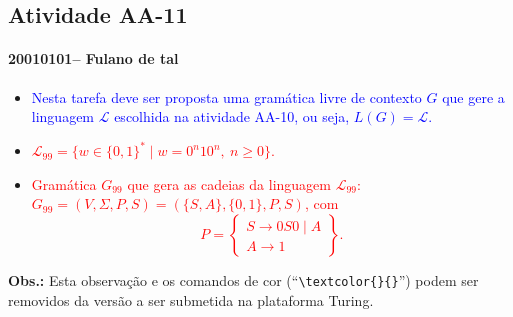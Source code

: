 \documentclass[12pt]{article}
\def\discente{Fulano de tal}
\def\matricula{20010101}
\def\aa{11}
\def\myling{{99}} %
\begin{document}
\subsection*{Atividade AA-\aa}
 \paragraph{\matricula -- \discente}
%
 \begin{itemize}
  \item \textcolor{blue}{Nesta tarefa deve ser proposta uma gramática livre de contexto $G$ que gere a linguagem $\mathcal{L}$ escolhida na atividade AA-10, ou seja, $L(G)=\mathcal{L}$.}
  \item \textcolor{red}{$\mathcal{L}_{\myling} = \{w\in\{0,1\}^*\mid w = 0^n10^n,\ n \geqslant 0\}$.}
  \item  \textcolor{red}{Gramática $G_{\myling}$ que gera as cadeias da linguagem $\mathcal{L}_{\myling}$:\\ $G_{\myling}=(V,\Sigma,P,S)=(\{S,A\},\{0,1\},P,S)$, com
  $$
   P =
   \left\{\begin{array}{l}
    S \to 0S0 \mid A\\
    A \to 1
   \end{array}\right\}.
  $$
  }
\end{itemize}
%
%
\noindent\textbf{Obs.:} Esta observação e os comandos de cor (``\verb|\textcolor{}{}|'') podem ser removidos da versão a ser submetida na plataforma Turing.
\end{document}
